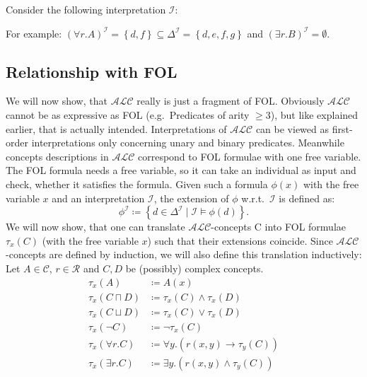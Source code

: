 \begin{example}
	Consider the following interpretation $\mathcal{I}$:
	\begin{figure}[H]
		\centering
	\end{figure}
	For example: $(\forall r.A)^\mathcal{I} = \left\{ d, f \right\} \subseteq \Delta^\mathcal{I} = \left\{ d,e,f,g \right\}$
	and $(\exists r.B)^\mathcal{I} = \emptyset$.
\end{example}

\subsection{Relationship with FOL}
We will now show, that $\mathcal{ALC}$ really is just a fragment of FOL.
Obviously $\mathcal{ALC}$ cannot be as expressive as FOL (e.g.\ Predicates of arity $ \geq 3$), but like explained earlier, that is actually intended.
\newline
Interpretations of $\mathcal{ALC}$ can be viewed as first-order interpretations only concerning unary and binary predicates.
Meanwhile concepts descriptions in $\mathcal{ALC}$ correspond to FOL formulae with one free variable. 
The FOL formula needs a free variable, so it can take an individual as input and check, whether it satisfies the formula.
\newline
Given such a formula $\phi (x)$ with the free variable $x$ and an interpretation $\mathcal{I}$, the extension of $\phi$ w.r.t.\ $\mathcal{I}$ is defined as:
\[
	\phi ^{\mathcal{I}} \coloneqq \left\{ d \in \Delta ^{\mathcal{I}} \mid \mathcal{I} \vDash \phi (d) \right\} 
.\]
We will now show, that one can translate $\mathcal{ALC}$-concepts C into FOL formulae $\tau_{x}(C)$ (with the free variable $x$) such that their extensions coincide.
Since $\mathcal{ALC}$-concepts are defined by induction, we will also define this translation inductively:
Let $A \in \mathscr{C}$, $r \in \mathscr{R}$ and $C, D$ be (possibly) complex concepts.
\begin{align*}
	\tau_{x}(A) &\coloneqq A(x) \\
	\tau_{x} \left( C \sqcap D \right) &\coloneqq \tau_{x}(C) \land \tau_{x}(D) \\
	\tau_{x} \left( C \sqcup D \right) &\coloneqq \tau_{x}(C) \lor \tau_{x}(D) \\
	\tau_{x} (\neg C) &\coloneqq \neg \tau_{x}(C) \\
	\tau_{x} \left( \forall r.C \right) &\coloneqq \forall y.(r(x,y) \rightarrow \tau_{y}(C)) \\
	\tau_{x} \left( \exists r.C \right) &\coloneqq \exists y.(r(x,y) \land \tau_{y}(C)) \\
\end{align*}

